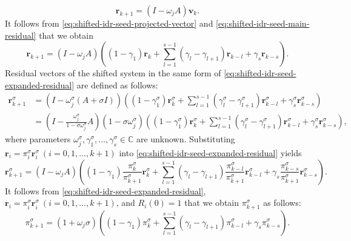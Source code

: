 \begin{equation}\label{eq:shifted-idr-seed-main-residual}\bm r_{k+1}=(I-\omega_jA)\bm v_k.\end{equation}
{It follows from \eqref{eq:shifted-idr-seed-projected-vector} and \eqref{eq:shifted-idr-seed-main-residual} that we obtain}
\begin{equation}\label{eq:shifted-idr-seed-expanded-residual}\bm r_{k+1}=(I-\omega_jA)\left((1-\gamma_1)\bm r_k+\sum_{l=1}^{s-1}(\gamma_l-\gamma_{l+1})\bm r_{k-l}+\gamma_s\bm r_{k-s}\right).\end{equation}
{Residual vectors of the shifted system in the same form of \eqref{eq:shifted-idr-seed-expanded-residual} are defined as follows:}
\begin{equation}\label{eq:shifted-idr-shifted-expanded-residual}\begin{aligned}\bm r_{k+1}^{\sigma}&=(I-\omega_j^{\sigma}(A+\sigma I))\left((1-\gamma_1^{\sigma})\bm r_k^{\sigma}+\sum_{l=1}^{s-1}(\gamma_l^{\sigma}-\gamma_{l+1}^{\sigma})\bm r_{k-l}^{\sigma}+\gamma_s^{\sigma}\bm r_{k-s}^{\sigma}\right)\\
&=\left(I-\frac{\omega_j^{\sigma}}{1-\sigma\omega_j^{\sigma}}A\right)(1-\sigma\omega_j^{\sigma})\left((1-\gamma_1^{\sigma})\bm r_k^{\sigma}+\sum_{l=1}^{s-1}(\gamma_l^{\sigma}-\gamma_{l+1}^{\sigma})\bm r_{k-l}^{\sigma}+\gamma_s^{\sigma}\bm r_{k-s}^{\sigma}\right),\end{aligned}\end{equation}
{where parameters $\omega_j^{\sigma},\gamma_1^{\sigma},\ldots,\gamma_s^{\sigma}\in\mathbb C$ are unknown. Substituting $\bm r_i=\pi_i^{\sigma}\bm r_i^{\sigma}\ (i=0,1,\ldots,k+1)$ into \eqref{eq:shifted-idr-seed-expanded-residual} yields}
\begin{equation}\label{eq:shifted-idr-scaled-main-residual}\bm r_{k+1}^{\sigma}=(I-\omega_jA)\left((1-\gamma_1)\frac{\pi_k^{\sigma}}{\pi_{k+1}^{\sigma}}\bm r_k^{\sigma}+\sum_{l=1}^{s-1}(\gamma_l-\gamma_{l+1})\frac{\pi_{k-l}^{\sigma}}{\pi_{k+1}^{\sigma}}\bm r_{k-l}^{\sigma}+\gamma_s\frac{\pi_{k-s}^{\sigma}}{\pi_{k+1}^{\sigma}}\bm r_{k-s}^{\sigma}\right).\end{equation}
{It follows from \eqref{eq:shifted-idr-seed-expanded-residual}, $\bm r_i=\pi_i^{\sigma}\bm r_i^{\sigma}\ (i=0,1,\ldots,k+1)$, and $R_i(0)=1$ that we obtain $\pi_{k+1}^{\sigma}$ as follows:}
\begin{equation}\label{eq:shifted-idr-main-pi}\pi_{k+1}^{\sigma}=(1+\omega_j\sigma)\left((1-\gamma_1)\pi_k^{\sigma}+\sum_{l=1}^{s-1}(\gamma_l-\gamma_{l+1})\pi_{k-l}^{\sigma}+\gamma_s\pi_{k-s}^{\sigma}\right).\end{equation}
